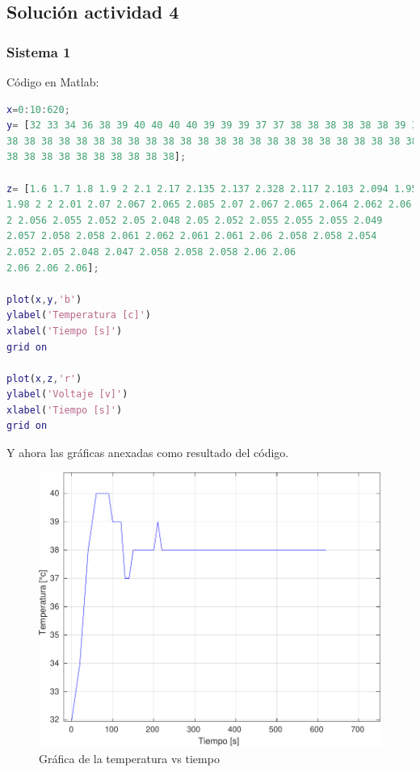 \subsection{Solución actividad 4}

\subsubsection{Sistema 1}

Código en Matlab:

\begin{lstlisting}[language=Matlab]
x=0:10:620;
y= [32 33 34 36 38 39 40 40 40 40 39 39 39 37 37 38 38 38 38 38 38 39 38 38 38 38
38 38 38 38 38 38 38 38 38 38 38 38 38 38 38 38 38 38 38 38 38 38 38 38 38 38 38
38 38 38 38 38 38 38 38 38 38];

z= [1.6 1.7 1.8 1.9 2 2.1 2.17 2.135 2.137 2.328 2.117 2.103 2.094 1.95
1.98 2 2 2.01 2.07 2.067 2.065 2.085 2.07 2.067 2.065 2.064 2.062 2.06
2 2.056 2.055 2.052 2.05 2.048 2.05 2.052 2.055 2.055 2.055 2.049 
2.057 2.058 2.058 2.061 2.062 2.061 2.061 2.06 2.058 2.058 2.054
2.052 2.05 2.048 2.047 2.058 2.058 2.058 2.06 2.06
2.06 2.06 2.06];

plot(x,y,'b')
ylabel('Temperatura [c]')
xlabel('Tiempo [s]')
grid on

plot(x,z,'r')
ylabel('Voltaje [v]')
xlabel('Tiempo [s]')
grid on
\end{lstlisting}

Y ahora las gráficas anexadas como resultado del código.

\begin{figure}[H]
	\centering
	\includegraphics[width=0.7\linewidth]{img2/Grafica1}
	\caption{Gráfica de la temperatura vs tiempo}
	\label{fig:grafica1}
\end{figure}

